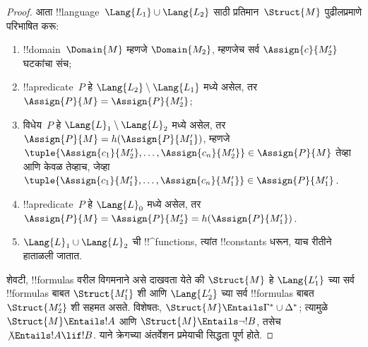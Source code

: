 \documentclass[../../../include/open-logic-section]{subfiles}
\begin{document}
\begin{proof}
आता !!{language}~$\Lang{L_1} \cup \Lang{L_2}$ साठी प्रतिमान~$\Struct{M}$
पुढीलप्रमाणे परिभाषित करू:
\begin{enumerate}
\item !!{domain}~$\Domain{M}$ म्हणजे $\Domain{M_2}$, म्हणजेच सर्व
  $\Assign{c}{M'_2}$ घटकांचा संच;
\item !!a{predicate}~$P$ हे $\Lang{L_2} \setminus \Lang{L_1}$ मध्ये
  असेल, तर $\Assign{P}{M} = \Assign{P}{M'_2}$;
\item विधेय~$P$ हे $\Lang{L}_1\setminus \Lang{L}_2$ मध्ये असेल, तर
  $\Assign{P}{M} = h(\Assign{P}{M'_1})$, म्हणजे
  $\tuple{\Assign{c_1}{M'_2}, \dots, \Assign{c_n}{M'_2}} \in
  \Assign{P}{M}$ तेव्हा आणि केवळ तेव्हाच, जेव्हा
  $\tuple{\Assign{c_1}{M'_1}, \dots, \Assign{c_n}{M'_1}} \in
  \Assign{P}{M'_1}$.
\item !!a{predicate}~$P$ हे $\Lang{L}_0$ मध्ये असेल, तर $\Assign{P}{M} =
  \Assign{P}{M'_2} = h(\Assign{P}{M'_1})$.
\item $\Lang{L}_1 \cup \Lang{L}_2$ ची !!^{function}s, त्यांत
  !!{constant}s धरून, याच रीतीने हाताळली जातात.
\end{enumerate}

शेवटी, !!{formula}s वरील विगमनाने असे दाखवता येते की $\Struct{M}$ हे
$\Lang{L'_1}$ च्या सर्व !!{formula}s बाबत $\Struct{M'_1}$ शी आणि
$\Lang{L'_2}$ च्या सर्व !!{formula}s बाबत $\Struct{M'_2}$ शी सहमत असते.
विशेषतः, $\Struct{M} \Entails \Gamma^* \cup \Delta^*$; त्यामुळे
$\Struct{M} \Entails !A$ आणि $\Struct{M} \Entails \lnot!B$, तसेच
$\not\Entails !A \lif !B$. याने क्रेगच्या अंतर्वेशन प्रमेयाची सिद्धता
पूर्ण होते.
\end{proof}
\end{document}
